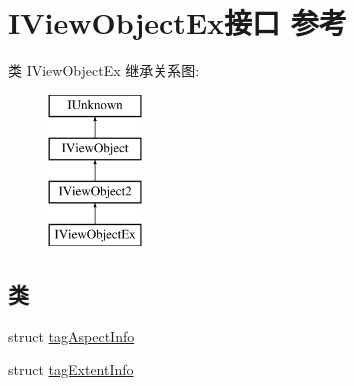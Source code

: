 \hypertarget{interface_i_view_object_ex}{}\section{I\+View\+Object\+Ex接口 参考}
\label{interface_i_view_object_ex}
类 I\+View\+Object\+Ex 继承关系图\+:\begin{figure}[H]
\begin{center}
\leavevmode
\includegraphics[height=4.000000cm]{interface_i_view_object_ex}
\end{center}
\end{figure}
\subsection*{类}
\begin{DoxyCompactItemize}
\item 
struct \hyperlink{struct_i_view_object_ex_1_1tag_aspect_info}{tag\+Aspect\+Info}
\item 
struct \hyperlink{struct_i_view_object_ex_1_1tag_extent_info}{tag\+Extent\+Info}
\end{DoxyCompactItemize}
